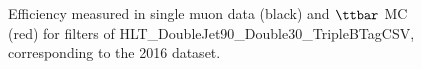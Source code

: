 \begin{figure}[p]
\caption[Efficiency measured in single muon data and $\ttbar$ MC for filters of HLT\_DoubleJet90\_Double30\_TripleBTagCSV path in 2016]{Efficiency measured in single muon data (black) and $\ttbar$ MC (red) for filters of HLT\_DoubleJet90\_Double30\_TripleBTagCSV, corresponding to the 2016 dataset.}
\label{trigger:fig:filterEfficiency2016DoubleOverlap}
\end{figure}

